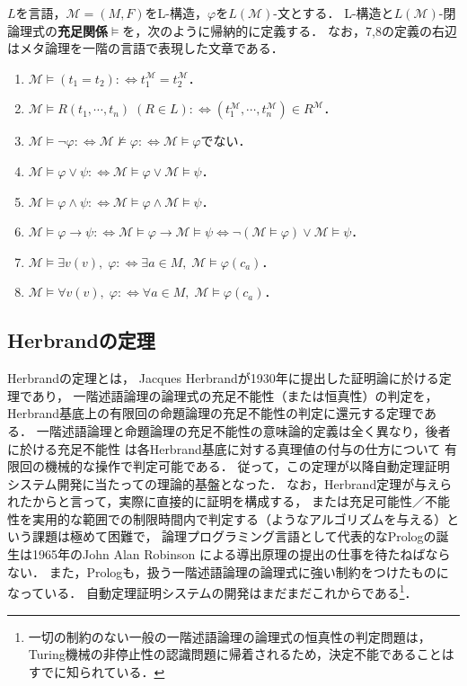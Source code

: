 \documentclass[uplatex,dvipdfmx]{jsarticle}
\begin{document}
\begin{definition}
    $L$を言語，$\mathcal{M}=(M,F)$をL-構造，$\varphi$を$L(\mathcal{M})$-文とする．
    L-構造と$L(\mathcal{M})$-閉論理式の\textbf{充足関係}$\vDash$を，次のように帰納的に定義する．
    なお，7,8の定義の右辺はメタ論理を一階の言語で表現した文章である．
    \begin{enumerate}
        \item $\mathcal{M}\vDash(t_1=t_2):\Leftrightarrow t^\mathcal{M}_1=t_2^\mathcal{M}$．
        \item $\mathcal{M}\vDash R(t_1,\cdots,t_n)\;(R\in L):\Leftrightarrow (t_1^\mathcal{M},\cdots,t_n^\mathcal{M})\in R^\mathcal{M}$．
        \item $\mathcal{M}\vDash\lnot\varphi:\Leftrightarrow\mathcal{M}\nvDash\varphi:\Leftrightarrow\mathcal{M}\vDash\varphi$でない．
        \item $\mathcal{M}\vDash\varphi\lor\psi:\Leftrightarrow\mathcal{M}\vDash\varphi\lor\mathcal{M}\vDash\psi$．
        \item $\mathcal{M}\vDash\varphi\land\psi:\Leftrightarrow\mathcal{M}\vDash\varphi\land\mathcal{M}\vDash\psi$．
        \item $\mathcal{M}\vDash\varphi\to\psi:\Leftrightarrow\mathcal{M}\vDash\varphi\to\mathcal{M}\vDash\psi\Leftrightarrow\lnot(\mathcal{M}\vDash\varphi)\lor\mathcal{M}\vDash\psi$．
        \item $\mathcal{M}\vDash\exists v(v),\;\varphi:\Leftrightarrow\exists a\in M,\; \mathcal{M}\vDash\varphi(c_a)$．
        \item $\mathcal{M}\vDash\forall v(v),\;\varphi:\Leftrightarrow\forall a\in M,\; \mathcal{M}\vDash\varphi(c_a)$．
    \end{enumerate}
\end{definition}

\subsection{Herbrandの定理}
\begin{screen}
Herbrandの定理とは，
Jacques Herbrandが1930年に提出した証明論に於ける定理であり，
一階述語論理の論理式の充足不能性（または恒真性）の判定を，Herbrand基底上の有限回の命題論理の充足不能性の判定に還元する定理である．
一階述語論理と命題論理の充足不能性の意味論的定義は全く異なり，後者に於ける充足不能性
は各Herbrand基底に対する真理値の付与の仕方について
有限回の機械的な操作で判定可能である．
従って，この定理が以降自動定理証明システム開発に当たっての理論的基盤となった．
なお，Herbrand定理が与えられたからと言って，実際に直接的に証明を構成する，
または充足可能性／不能性を実用的な範囲での制限時間内で判定する（ようなアルゴリズムを与える）という課題は極めて困難で，
論理プログラミング言語として代表的なPrologの誕生は1965年のJohn Alan Robinson
による導出原理の提出の仕事を待たねばならない．
また，Prologも，扱う一階述語論理の論理式に強い制約をつけたものになっている．
自動定理証明システムの開発はまだまだこれからである\footnote{一切の制約のない一般の一階述語論理の論理式の恒真性の判定問題は，Turing機械の非停止性の認識問題に帰着されるため，決定不能であることはすでに知られている．}．
\end{screen}
\end{document}
